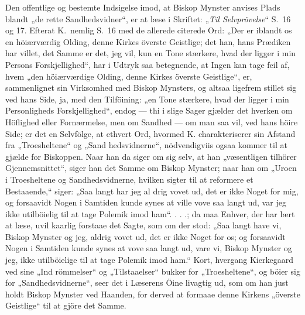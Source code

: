\documentclass[12pt,a4paper]{article}
\newcommand{\opage}[1]{\marginnote{\footnotesize\textit{[#1]}}}
\begin{document}
Den offentlige og bestemte Indsigelse imod, at Biskop
Mynster anvises Plads blandt „de rette Sandhedsvidner“,
er at læse i Skriftet: „\emph{Til Selvprövelse}“ S.\ 16 og 17.
Efterat K.\ nemlig S.\ 16 med de allerede citerede Ord:
„Der er iblandt os en höiærværdig Olding, denne Kirkes
överste Geistlige; det han, hans Prædiken har villet,
det Samme er det, jeg vil, kun en Tone stærkere, hvad
der ligger i min Persons Forskjellighed“, har i Udtryk
saa betegnende, at Ingen kan tage feil af, hvem „den
höiærværdige Olding, denne Kirkes överste Geistlige“,
er, sammenlignet sin Virksomhed med Biskop Mynsters,
og altsaa ligefrem stillet sig ved hans Side, ja, med den
Tilföining: „en Tone stærkere, hvad der ligger i min
Personligheds Forskjellighed“, endog --- thi i slige Sager
gjælder det hverken om Höflighed eller Fornærmelse,
men om Sandhed --- om man saa vil, ved hans höire
Side; er det en Selvfölge, at ethvert Ord, hvormed K.
charakteriserer sin Afstand fra „Troesheltene“ og „Sand\-%
hedsvidnerne“, nödvendigviis ogsaa kommer til at gjælde
for Biskoppen. Naar han da siger om sig selv, at han
„væsentligen tilhörer Gjennemsnittet“, siger han det
Samme om Biskop Mynster; naar han om „Uroen i
Troesheltene og Sandhedsvidnerne, hvilken sigter til at
reformere et Bestaaende,“ siger: „Saa langt har jeg al\-%
drig vovet ud, det er ikke Noget for mig, og forsaavidt
Nogen i Samtiden kunde synes at ville vove saa langt
\opage{19} %
ud, var jeg ikke utilböielig til at tage Polemik imod
ham“. . . .; da maa Enhver, der har lært at læse, uvil\-%
kaarlig forstaae det Sagte, som om der stod: „Saa langt
have vi, Biskop Mynster og jeg, aldrig vovet ud, det
er ikke Noget for os; og forsaavidt Nogen i Samtiden
kunde synes at vove saa langt ud, vare vi, Biskop
Mynster og jeg, ikke utilböielige til at tage Polemik
imod ham.“ Kort, hvergang Kierkegaard ved sine „Ind\-%
römmelser“ og „Tilstaaelser“ bukker for „Troesheltene“,
og böier sig for „Sandhedsvidnerne“, seer det i Læserens
Öine livagtig ud, som om han just holdt Biskop Mynster
ved Haanden, for derved at formaae denne Kirkens
„överste Geistlige“ til at gjöre det Samme.
\end{document}
